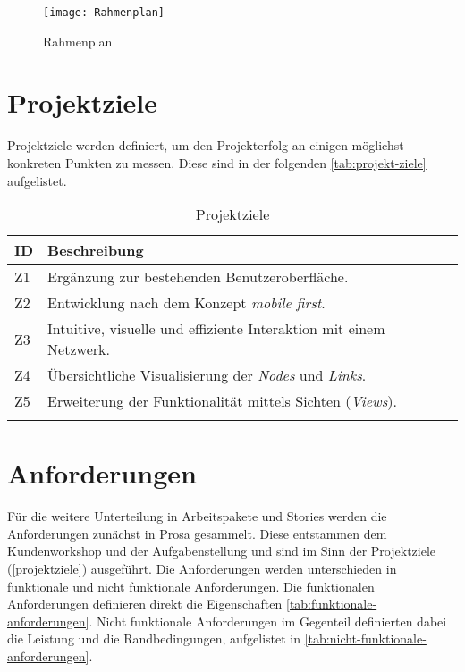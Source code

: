 
\newpage

\begin{landscape}
\begin{figure}[ht]
\centering
\texttt{[image: Rahmenplan]}
\caption{Rahmenplan}
\label{fig:rahmenplan}
\end{figure}
\end{landscape}

\newpage

\section{Projektziele} \label{projektziele}
Projektziele werden definiert, um den Projekterfolg an einigen mög\-li\-chst konkreten Punkten zu messen. Diese sind in der folgenden \autoref{tab:projekt-ziele} aufgelistet.

\begin{longtable}{|p{1cm}  | p{10.5cm}|}
  \hline
    ID &  Beschreibung \\\hline
    Z1 & Ergänzung zur bestehenden Benutzeroberfläche.\\\hline
    Z2 & Entwicklung nach dem Konzept \textit{mobile first}.\\\hline
    Z3 & Intuitive, visuelle und effiziente Interaktion mit einem Netzwerk.\\\hline
    Z4 & Übersichtliche Visualisierung der \textit{Nodes} und \textit{Links}.\\\hline
    Z5 & Erweiterung der Funktionalität mittels Sichten (\textit{Views}).\\\hline
    \caption{Projektziele}
  \label{tab:projekt-ziele}
\end{longtable}

\section{Anforderungen} \label{anforderungen}

Für die weitere Unterteilung in Arbeitspakete und Stories werden die Anforderungen zunächst in Prosa gesammelt. Diese entstammen dem Kundenworkshop und der Aufgabenstellung und sind im Sinn der Projektziele (\autoref{projektziele}) ausgeführt. Die Anforderungen werden unterschieden in funktionale und nicht funktionale Anforderungen. Die funktionalen Anforderungen definieren direkt die Eigenschaften \autoref{tab:funktionale-anforderungen}. Nicht funktionale Anforderungen im Gegenteil definierten dabei die Leistung und die Randbedingungen, aufgelistet in \autoref{tab:nicht-funktionale-anforderungen}.


